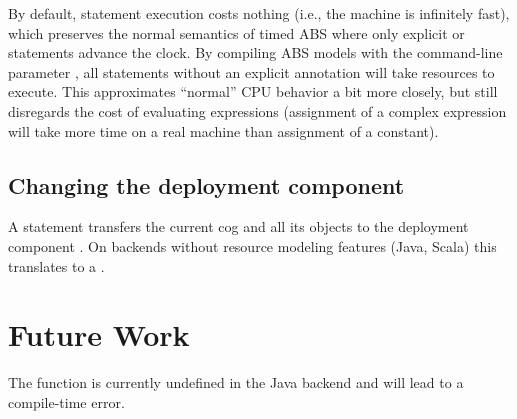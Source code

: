    By default, statement execution costs nothing (i.e., the machine is
   infinitely fast), which preserves the normal semantics of timed ABS
   where only explicit  or  statements
   advance the clock.  By compiling ABS models with the command-line
   parameter , all statements without an explicit
   \absinline{[Cost: x]} annotation will take  resources to execute.
   This approximates ``normal'' CPU behavior a bit more closely, but still
   disregards the cost of evaluating expressions (assignment of a
   complex expression will take more time on a real machine than
   assignment of a constant).

\subsection{Changing the deployment component}

   A statement  transfers the current cog and all its
   objects to the deployment component .  On backends without
   resource modeling features (Java, Scala) this translates to a
   .

\section{Future Work}

The  function is currently undefined in the Java
backend and will lead to a compile-time error.
